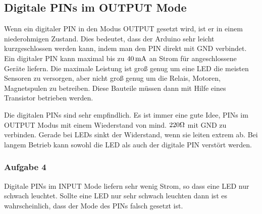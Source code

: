 \subsection{Digitale PINs im OUTPUT Mode} 
Wenn ein digitaler PIN in den Modus OUTPUT gesetzt wird,
ist er in einem niederohmigen Zustand. Dies bedeutet, dass der Arduino sehr leicht kurzgeschlossen werden kann, indem man den PIN direkt mit GND verbindet. Ein digitaler PIN kann maximal bis zu $40\operatorname{mA}$ an Strom für  angeschlossene Geräte liefern. Die maximale Leistung ist groß genug um eine LED die meisten Sensoren zu versorgen, aber nicht groß genug um die Relais, Motoren, Magnetspulen zu betreiben. Diese Bauteile müssen dann mit Hilfe eines Transistor betrieben werden. 

Die digitalen PINs sind sehr empfindlich. Es ist immer eine gute Idee, PINs im OUTPUT Modus mit einem Wiederstand von mind. $220\Omega$  mit GND zu verbinden.
Gerade bei LEDs sinkt der Widerstand, wenn sie leiten extrem ab. Bei langem Betrieb kann sowohl die LED als auch der digitale PIN verstört werden. 
 
\subsubsection{Aufgabe 4}

Digitale PINs im INPUT Mode liefern sehr wenig Strom, so dass eine LED nur schwach leuchtet. Sollte eine LED nur sehr schwach leuchten dann ist es wahrscheinlich, dass der Mode des PINs falsch gesetzt ist.

